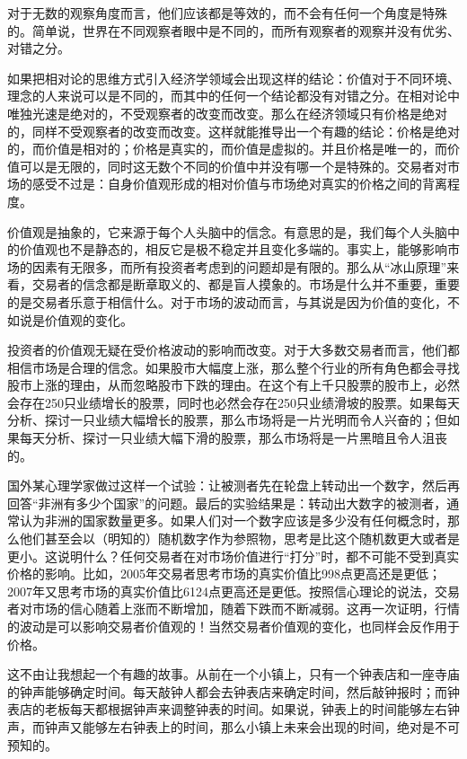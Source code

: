 对于无数的观察角度而言，他们应该都是等效的，而不会有任何一个角度是特殊的。简单说，世界在不同观察者眼中是不同的，而所有观察者的观察并没有优劣、对错之分。

如果把相对论的思维方式引入经济学领域会出现这样的结论：价值对于不同环境、理念的人来说可以是不同的，而其中的任何一个结论都没有对错之分。在相对论中唯独光速是绝对的，不受观察者的改变而改变。那么在经济领域只有价格是绝对的，同样不受观察者的改变而改变。这样就能推导出一个有趣的结论：价格是绝对的，而价值是相对的；价格是真实的，而价值是虚拟的。并且价格是唯一的，而价值可以是无限的，同时这无数个不同的价值中并没有哪一个是特殊的。交易者对市场的感受不过是：自身价值观形成的相对价值与市场绝对真实的价格之间的背离程度。

价值观是抽象的，它来源于每个人头脑中的信念。有意思的是，我们每个人头脑中的价值观也不是静态的，相反它是极不稳定并且变化多端的。事实上，能够影响市场的因素有无限多，而所有投资者考虑到的问题却是有限的。那么从“冰山原理”来看，交易者的信念都是断章取义的、都是盲人摸象的。市场是什么并不重要，重要的是交易者乐意于相信什么。对于市场的波动而言，与其说是因为价值的变化，不如说是价值观的变化。

投资者的价值观无疑在受价格波动的影响而改变。对于大多数交易者而言，他们都相信市场是合理的信念。如果股市大幅度上涨，那么整个行业的所有角色都会寻找股市上涨的理由，从而忽略股市下跌的理由。在这个有上千只股票的股市上，必然会存在250只业绩增长的股票，同时也必然会存在250只业绩滑坡的股票。如果每天分析、探讨一只业绩大幅增长的股票，那么市场将是一片光明而令人兴奋的；但如果每天分析、探讨一只业绩大幅下滑的股票，那么市场将是一片黑暗且令人沮丧的。

国外某心理学家做过这样一个试验：让被测者先在轮盘上转动出一个数字，然后再回答“非洲有多少个国家”的问题。最后的实验结果是：转动出大数字的被测者，通常认为非洲的国家数量更多。如果人们对一个数字应该是多少没有任何概念时，那么他们甚至会以（明知的）随机数字作为参照物，思考是比这个随机数更大或者是更小。这说明什么？任何交易者在对市场价值进行“打分”时，都不可能不受到真实价格的影响。比如，2005年交易者思考市场的真实价值比998点更高还是更低；2007年又思考市场的真实价值比6124点更高还是更低。按照信心理论的说法，交易者对市场的信心随着上涨而不断增加，随着下跌而不断减弱。这再一次证明，行情的波动是可以影响交易者价值观的！当然交易者价值观的变化，也同样会反作用于价格。

这不由让我想起一个有趣的故事。从前在一个小镇上，只有一个钟表店和一座寺庙的钟声能够确定时间。每天敲钟人都会去钟表店来确定时间，然后敲钟报时；而钟表店的老板每天都根据钟声来调整钟表的时间。如果说，钟表上的时间能够左右钟声，而钟声又能够左右钟表上的时间，那么小镇上未来会出现的时间，绝对是不可预知的。

